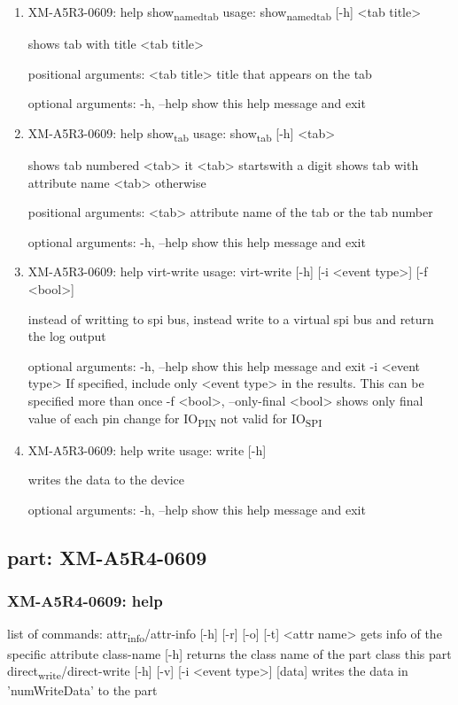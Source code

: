 \documentclass[11pt]{article}
\begin{document}
\begin{enumerate}
\item XM-A5R3-0609: help show\textsubscript{named}\textsubscript{tab}
\label{sec:org55c12ab}
usage: show\textsubscript{named}\textsubscript{tab} [-h] <tab title>

shows tab with title <tab title>

positional arguments:
  <tab title>  title that appears on the tab

optional arguments:
  -h, --help   show this help message and exit

\item XM-A5R3-0609: help show\textsubscript{tab}
\label{sec:orge1b7abd}
usage: show\textsubscript{tab} [-h] <tab>

shows tab numbered <tab> it <tab> startswith a digit shows tab with attribute
name <tab> otherwise

positional arguments:
  <tab>       attribute name of the tab or the tab number

optional arguments:
  -h, --help  show this help message and exit

\item XM-A5R3-0609: help virt-write
\label{sec:org2e3c46c}
usage: virt-write [-h] [-i <event type>] [-f <bool>]

instead of writting to spi bus, instead write to a virtual spi bus and return
the log output

optional arguments:
  -h, --help            show this help message and exit
  -i <event type>       If specified, include only <event type> in the
                        results. This can be specified more than once
  -f <bool>, --only-final <bool>
                        shows only final value of each pin change for IO\textsubscript{PIN}
                        not valid for IO\textsubscript{SPI}

\item XM-A5R3-0609: help write
\label{sec:org518d0d9}
usage: write [-h]

writes the data to the device

optional arguments:
  -h, --help  show this help message and exit
\end{enumerate}

\subsection{part: XM-A5R4-0609}
\label{sec:org9a900cc}
\subsubsection{XM-A5R4-0609: help}
\label{sec:orgb7a62ec}
list of commands:
  attr\textsubscript{info}/attr-info [-h] [-r] [-o] [-t] <attr name>
    gets info of the specific attribute
  class-name [-h]
    returns the class name of the part class this part
  direct\textsubscript{write}/direct-write [-h] [-v] [-i <event type>] [data]
    writes the data in 'numWriteData' to the part
\end{document}
